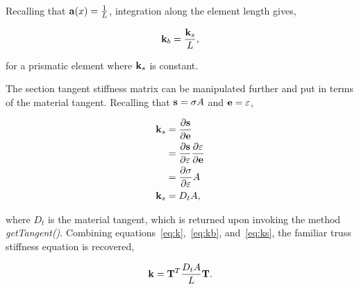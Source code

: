\documentclass[12pt]{article}
\begin{document}
\noindent Recalling that ${\bf a}(x) = \frac{1}{L}$, integration along the
element length gives,

\begin{equation}
{\bf k}_b = \label{eq:kb} \frac{{\bf k}_s}{L},
\end{equation}

\noindent for a prismatic element where ${\bf k}_s$ is constant.

The section tangent stiffness matrix can be manipulated further and put
in terms of the material tangent. Recalling that ${\bf s} = \sigma A$ and
${\bf e} = \varepsilon$,

\begin{align}
{\bf k}_s &= \frac{\partial{\bf s}}{\partial{\bf e}} \\
&= \frac{\partial{\bf s}}{\partial{\varepsilon}}\frac{\partial{\varepsilon}}{\partial{\bf e}} \\
&= \frac{\partial{\sigma}}{\partial{\varepsilon}} A \\
{\bf k}_s &= \label{eq:ks} D_t A,
\end{align}

\noindent where $D_t$ is the material tangent, which is returned upon invoking
the method {\em getTangent()}. Combining equations~\ref{eq:k},~\ref{eq:kb},
and~\ref{eq:ks}, the familiar truss stiffness equation is recovered,

\begin{equation}
{\bf k} = {\bf T}^T \frac{D_t A}{L} {\bf T}.
\end{equation}
\end{document}
